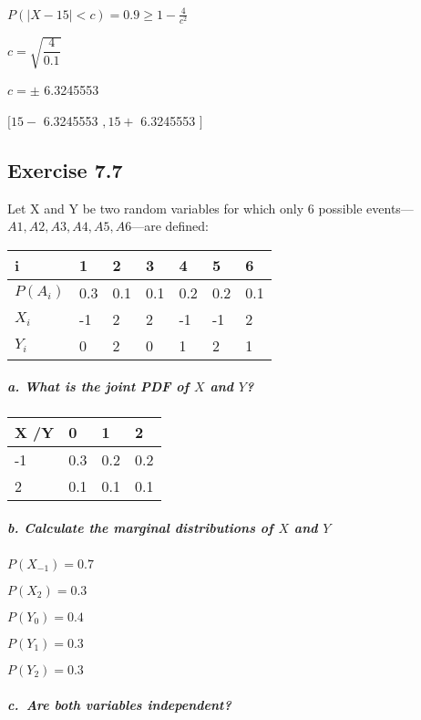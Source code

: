 \documentclass[
]{article}
\begin{document}
\(P(|X -15 | < c) = 0.9 \geq 1 - \frac{4}{c^2}\)

\(c = \sqrt{\dfrac{4}{0.1}}\)

\(c = \pm\) 6.3245553

\([15 -\) 6.3245553 \(, 15 +\) 6.3245553 \(]\)

\hypertarget{exercise-7.7}{%
\subsection{Exercise 7.7}\label{exercise-7.7}}

Let X and Y be two random variables for which only 6 possible events---
\(A1, A2, A3, A4, A5, A6\)---are defined:

\begin{longtable}[]{@{}lllllll@{}}
\toprule
i & 1 & 2 & 3 & 4 & 5 & 6 \\
\midrule
\endhead
\(P(A_i)\) & 0.3 & 0.1 & 0.1 & 0.2 & 0.2 & 0.1 \\
\(X_i\) & -1 & 2 & 2 & -1 & -1 & 2 \\
\(Y_i\) & 0 & 2 & 0 & 1 & 2 & 1 \\
\bottomrule
\end{longtable}

\hypertarget{a.-what-is-the-joint-pdf-of-x-and-y}{%
\subparagraph{\texorpdfstring{a. What is the joint PDF of \(X\) and
\(Y\)?}{a. What is the joint PDF of X and Y?}}\label{a.-what-is-the-joint-pdf-of-x-and-y}}

\begin{longtable}[]{@{}llll@{}}
\toprule
X /Y & 0 & 1 & 2 \\
\midrule
\endhead
-1 & 0.3 & 0.2 & 0.2 \\
2 & 0.1 & 0.1 & 0.1 \\
\bottomrule
\end{longtable}

\hypertarget{b.-calculate-the-marginal-distributions-of-x-and-y}{%
\subparagraph{\texorpdfstring{b. Calculate the marginal distributions of
\(X\) and
\(Y\)}{b. Calculate the marginal distributions of X and Y}}\label{b.-calculate-the-marginal-distributions-of-x-and-y}}

\(P(X_{-1}) = 0.7\)

\(P(X_2) = 0.3\)

\(P(Y_0) = 0.4\)

\(P(Y_1) = 0.3\)

\(P(Y_2) = 0.3\)

\hypertarget{c.-are-both-variables-independent}{%
\subparagraph{c.~Are both variables
independent?}\label{c.-are-both-variables-independent}}
\end{document}
